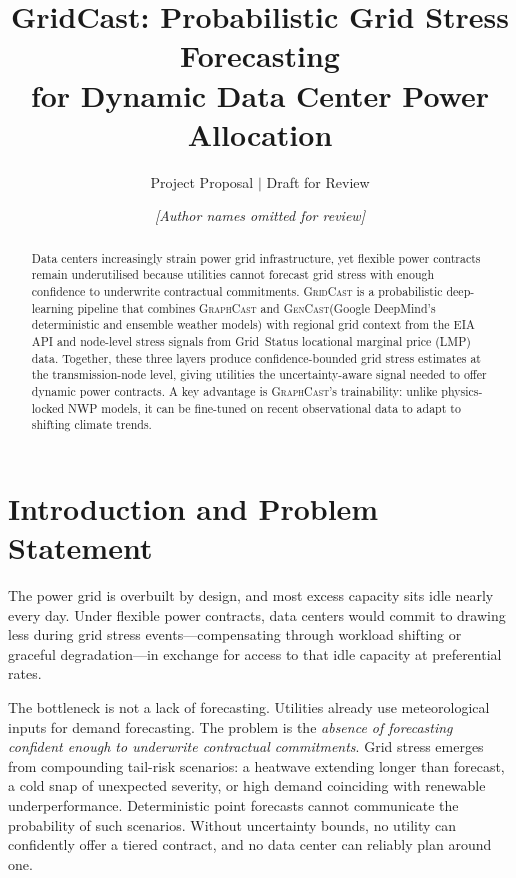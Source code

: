 \documentclass[10pt,letterpaper]{article}
\title{GridCast: Probabilistic Grid Stress Forecasting\\
       for Dynamic Data Center Power Allocation}
\subtitle{Project Proposal $\vert$ Draft for Review}
\author{%
  \textit{[Author names omitted for review]}
}
\date{}
\newcommand{\gridcast}{\textsc{GridCast}\xspace}
\newcommand{\graphcast}{\textsc{GraphCast}\xspace}
\newcommand{\gencast}{\textsc{GenCast}\xspace}
\begin{document}
\maketitle

\begin{abstract}
Data centers increasingly strain power grid infrastructure, yet flexible power contracts remain
underutilised because utilities cannot forecast grid stress with enough confidence to underwrite
contractual commitments. \gridcast is a probabilistic deep-learning pipeline that combines
\graphcast and \gencast (Google DeepMind's deterministic and ensemble weather models) with
regional grid context from the EIA API and node-level stress signals from Grid~Status
locational marginal price (LMP) data. Together, these three layers produce
confidence-bounded grid stress estimates at the transmission-node level, giving utilities the
uncertainty-aware signal needed to offer dynamic power contracts. A key advantage is
\graphcast's trainability: unlike physics-locked NWP models, it can be fine-tuned on recent
observational data to adapt to shifting climate trends.
\end{abstract}

\section{Introduction and Problem Statement}

The power grid is overbuilt by design, and most excess capacity sits idle nearly every day.
Under flexible power contracts, data centers would commit to drawing less during grid stress
events---compensating through workload shifting or graceful degradation---in exchange for
access to that idle capacity at preferential rates.

The bottleneck is not a lack of forecasting. Utilities already use meteorological inputs for
demand forecasting. The problem is the \emph{absence of forecasting confident enough to
underwrite contractual commitments}. Grid stress emerges from compounding tail-risk
scenarios: a heatwave extending longer than forecast, a cold snap of unexpected severity,
or high demand coinciding with renewable underperformance. Deterministic point forecasts
cannot communicate the probability of such scenarios. Without uncertainty bounds, no utility
can confidently offer a tiered contract, and no data center can reliably plan around one.
\end{document}
